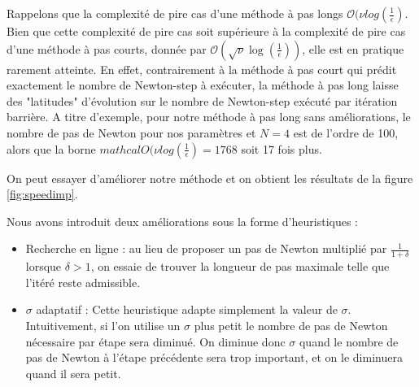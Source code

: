 Rappelons que la complexité de pire cas d'une méthode à pas longs  $\mathcal{O}(\nu log(\frac{1}{\epsilon})$. Bien que cette complexité de pire cas soit supérieure à la complexité de pire cas d'une méthode à pas courts, donnée par $\mathcal{O}(\sqrt{\nu} \log(\frac{1}{\epsilon}))$, elle est en pratique rarement atteinte. En effet, contrairement à la méthode à pas court qui prédit exactement le nombre de Newton-step à exécuter, la méthode à pas long laisse des "latitudes" d'évolution sur le nombre de Newton-step exécuté par itération barrière. A titre d'exemple, pour notre méthode à pas long sans améliorations, le nombre de pas de Newton pour nos paramètres et $N=4$ est de l'ordre de 100, alors que la borne $mathcal{O}(\nu log(\frac{1}{\epsilon}) = 1768$ soit 17 fois plus.


On peut essayer d'améliorer notre méthode et on obtient les résultats de la figure \ref{fig:speedimp}.

Nous avons introduit deux améliorations sous la forme d'heuristiques : 
\begin{itemize}
\item Recherche en ligne : au lieu de proposer un pas de Newton multiplié par $\frac{1}{1+\delta}$ lorsque $\delta>1$, on essaie de trouver la longueur de pas maximale telle que l'itéré reste admissible.
\item $\sigma$ adaptatif : Cette heuristique adapte simplement la valeur de $\sigma$. Intuitivement, si l'on utilise un $\sigma$ plus petit le nombre de pas de Newton nécessaire par étape sera diminué. On diminue donc $\sigma$ quand le nombre de pas de Newton à l'étape précédente sera trop important, et on le diminuera quand il sera petit.
\end{itemize}

